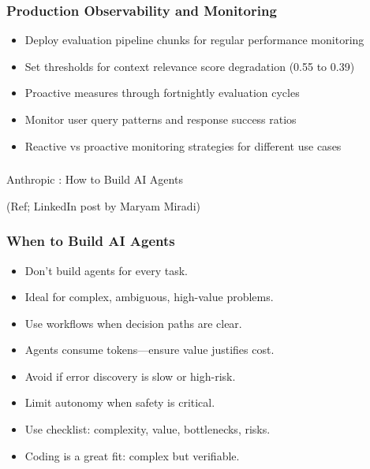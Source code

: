 \begin{frame}[fragile]\frametitle{Production Observability and Monitoring}
      \begin{itemize}
	\item Deploy evaluation pipeline chunks for regular performance monitoring
	\item Set thresholds for context relevance score degradation (0.55 to 0.39)
	\item Proactive measures through fortnightly evaluation cycles
	\item Monitor user query patterns and response success ratios
	\item Reactive vs proactive monitoring strategies for different use cases
	  \end{itemize}
\end{frame}

\begin{frame}[fragile]\frametitle{}
\begin{center}
{\Large Anthropic :  How to Build AI Agents}

{\tiny (Ref; LinkedIn post by Maryam Miradi)}
\end{center}
\end{frame}

\begin{frame}[fragile]\frametitle{When to Build AI Agents}
    \begin{itemize}
        \item Don’t build agents for every task.
        \item Ideal for complex, ambiguous, high-value problems.
        \item Use workflows when decision paths are clear.
        \item Agents consume tokens—ensure value justifies cost.
        \item Avoid if error discovery is slow or high-risk.
        \item Limit autonomy when safety is critical.
        \item Use checklist: complexity, value, bottlenecks, risks.
        \item Coding is a great fit: complex but verifiable.
    \end{itemize}
\end{frame}

